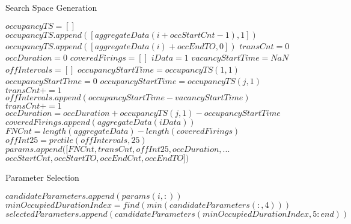 \begin{algorithm}                      %
\caption{Search Space Generation}          %
\label{alg:paramGen}                           %
\begin{algorithmic}                    %
\STATE $occupancyTS = []$
\STATE $occupancyTS.append([aggregateData(i+occStartCnt-1), 1])$
\STATE $occupancyTS.append([aggregateData(i) +
  occEndTO, 0])$
\ENDIF
\ENDFOR
\STATE $transCnt = 0$
\STATE $occDuration = 0$
\STATE $coveredFirings = []$
\STATE $iData = 1$
\STATE $vacancyStartTime = NaN$
\STATE $offIntervals = []$
\STATE $occupancyStartTime = occupancyTS(1, 1)$
\ELSE
\STATE $occupancyStartTime = 0$
\ENDIF
{}
\STATE $occupancyStartTime = occupancyTS(j, 1)$
\STATE $transCnt += 1$
\STATE $offIntervals.append(occupancyStartTime - vacancyStartTime)$
\ENDIF
{}
\STATE $transCnt += 1$
\STATE $occDuration = occDuration +
occupancyTS(j, 1) - occupancyStartTime$
\STATE
$coveredFirings.append(aggregateData(iData))$
\ENDIF
\ENDWHILE
\ENDIF
\STATE $FNCnt = length(aggregateData) - length(coveredFirings)$
\STATE $offInt25 = prctile(offIntervals, 25)$
\STATE $params.append([FNCnt, transCnt, offInt25, occDuration, ...$
\STATE $occStartCnt, occStartTO, occEndCnt, occEndTO])$
\ENDFOR
\ENDFOR
\ENDFOR
\ENDFOR
\ENDFOR
\end{algorithmic}
\end{algorithm}

\begin{algorithm}                      %
\caption{Parameter Selection}          %
\label{alg:paramSelection}                           %
\begin{algorithmic}                    %
\STATE $candidateParameters.append(params(i, :))$
\ENDIF 
\ENDFOR
\STATE $minOccupiedDurationIndex = find(min(candidateParameters(:, 4)))$
\STATE $selectedParameters.append(candidateParameters(minOccupiedDurationIndex, 5:end))$
\end{algorithmic}
\end{algorithm}


